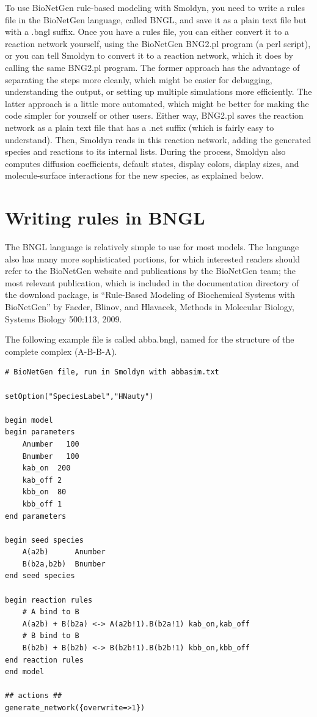 \documentclass {scrbook}
\begin{document}
To use BioNetGen rule-based modeling with Smoldyn, you need to write a rules file in the BioNetGen language, called BNGL, and save it as a plain text file but with a .bngl suffix. Once you have a rules file, you can either convert it to a reaction network yourself, using the BioNetGen BNG2.pl program (a perl script), or you can tell Smoldyn to convert it to a reaction network, which it does by calling the same BNG2.pl program. The former approach has the advantage of separating the steps more cleanly, which might be easier for debugging, understanding the output, or setting up multiple simulations more efficiently. The latter approach is a little more automated, which might be better for making the code simpler for yourself or other users. Either way, BNG2.pl saves the reaction network as a plain text file that has a .net suffix (which is fairly easy to understand). Then, Smoldyn reads in this reaction network, adding the generated species and reactions to its internal lists. During the process, Smoldyn also computes diffusion coefficients, default states, display colors, display sizes, and molecule-surface interactions for the new species, as explained below.

\section{Writing rules in BNGL}

The BNGL language is relatively simple to use for most models. The language also has many more sophisticated portions, for which interested readers should refer to the BioNetGen website and publications by the BioNetGen team; the most relevant publication, which is included in the documentation directory of the download package, is ``Rule-Based Modeling of Biochemical Systems with BioNetGen'' by Faeder, Blinov, and Hlavacek, Methods in Molecular Biology, Systems Biology 500:113, 2009.

The following example file is called abba.bngl, named for the structure of the complete complex (A-B-B-A).

\begin{lstlisting}[style=SSAC]
# BioNetGen file, run in Smoldyn with abbasim.txt

setOption("SpeciesLabel","HNauty")

begin model
begin parameters
	Anumber   100
	Bnumber   100
	kab_on	200
	kab_off	2
	kbb_on	80
	kbb_off	1
end parameters

begin seed species
	A(a2b)		Anumber
	B(b2a,b2b)	Bnumber
end seed species

begin reaction rules
	# A bind to B
	A(a2b) + B(b2a) <-> A(a2b!1).B(b2a!1) kab_on,kab_off
	# B bind to B
	B(b2b) + B(b2b) <-> B(b2b!1).B(b2b!1) kbb_on,kbb_off
end reaction rules
end model

## actions ##
generate_network({overwrite=>1})
\end{lstlisting}
\end{document}
